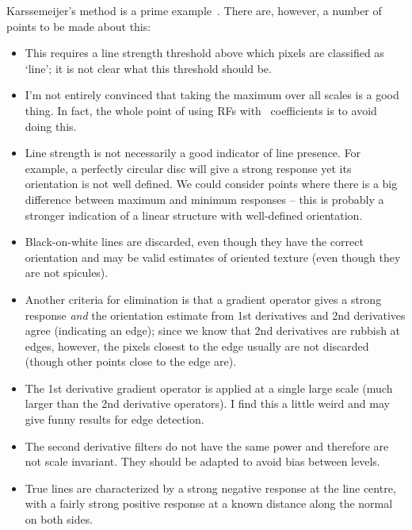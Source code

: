 Karssemeijer's method is a prime example~\cite{Karssemeijer_teBrake_TMI96}. There are, however, a number of points to be made about this:

\begin{itemize}
\item This requires a line strength threshold above which pixels are classified as `line'; it is not clear what this threshold should be. 

\item I'm not entirely convinced that taking the maximum over all scales is a good thing. In fact, the whole point of using RFs with \dtcwt~coefficients is to avoid doing this.

\item Line strength is not necessarily a good indicator of line presence. For example, a perfectly circular disc will give a strong response yet its orientation is not well defined. We could consider points where there is a big difference between maximum and minimum responses -- this is probably a stronger indication of a linear structure with well-defined orientation.

\item Black-on-white lines are discarded, even though they have the correct orientation and may be valid estimates of oriented texture (even though they are not spicules). 

\item Another criteria for elimination is that a gradient operator gives a strong response \emph{and} the orientation estimate from 1st derivatives and 2nd derivatives agree (indicating an edge); since we know that 2nd derivatives are rubbish at edges, however, the pixels closest to the edge usually are not discarded (though other points close to the edge are).

\item The 1st derivative gradient operator is applied at a single large scale (much larger than the 2nd derivative operators). I find this a little weird and may give funny results for edge detection.

\item The second derivative filters do not have the same power and therefore are not scale invariant. They should be adapted to avoid bias between levels.

\item True lines are characterized by a strong negative response at the line centre, with a fairly strong positive response at a known distance along the normal on both sides. 
\end{itemize}


